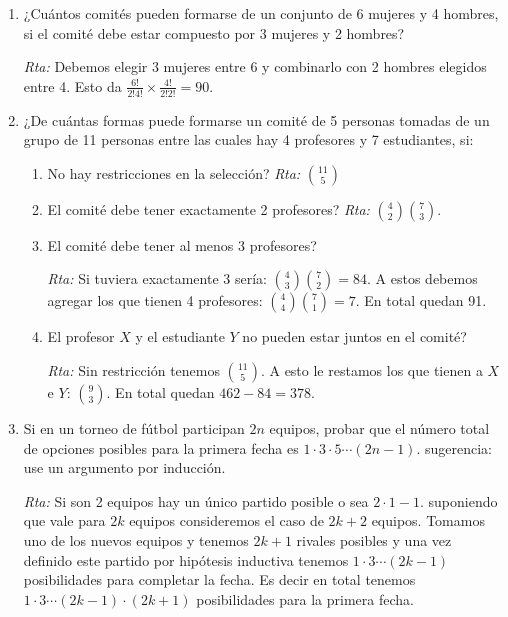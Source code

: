 \documentclass[a4paper,12pt,twoside,spanish,reqno]{amsbook}
\numberwithin{equation}{section}
\begin{document}
\begin{enumerate}
\item ¿Cuántos comités pueden formarse de un conjunto de 6 mujeres y 4 hombres, si el comité debe estar compuesto por 3 mujeres y 2 hombres?

\noindent\textit{Rta:} Debemos elegir 3 mujeres entre 6 y combinarlo con 2 hombres elegidos entre 4. Esto da $\frac{6!}{2!4!}\times \frac{4!}{2!2!}=90$.

\medskip

\item ¿De cuántas formas puede formarse un comité de 5 personas tomadas de un grupo
de 11 personas entre las cuales hay 4 profesores y 7 estudiantes, si:
\begin{enumerate}
\item 
No hay restricciones en la selección?
\noindent\textit{Rta:}  $\binom{11}{5}$

\item El comité debe tener exactamente 2 profesores?
\noindent\textit{Rta:}  $\binom{4}{2}\binom{7}{3}$.

\item El comité debe tener al menos 3 profesores?

\noindent\textit{Rta:} Si tuviera exactamente 3 sería:  $\binom{4}{3}\binom{7}{2}=84$. A estos debemos agregar los que tienen 4 profesores:  $\binom{4}{4}\binom{7}{1}=7$. En total quedan 91.


\item El profesor $X$ y el estudiante $Y$ no pueden estar juntos en el comité?

\noindent\textit{Rta:} Sin restricción tenemos  $\binom{11}{5}$. A esto le restamos los que tienen a $X$ e $Y$:  $\binom{9}{3}$.
En total quedan $462-84=378$. 
\end{enumerate}

\medskip

\item Si en un torneo de fútbol participan $2n$ equipos, probar que el número total de opciones posibles para la primera fecha es $1\cdot 3\cdot 5 \cdots (2n - 1)$. sugerencia: use un argumento por inducción. 

\noindent\textit{Rta:} Si son 2 equipos hay un único partido posible o sea $2\cdot 1-1$. suponiendo que vale para $2k$ equipos consideremos el caso de $2k+2$ equipos. Tomamos uno de los nuevos equipos y tenemos $2k+1$ rivales posibles y una vez definido este partido por hipótesis inductiva tenemos $1\cdot 3\cdots (2k-1)$ posibilidades para completar la fecha. Es decir en total tenemos $1\cdot 3\cdots(2k-1)\cdot(2k+1)$ posibilidades para la primera fecha.


\end{enumerate}
\end{document}
